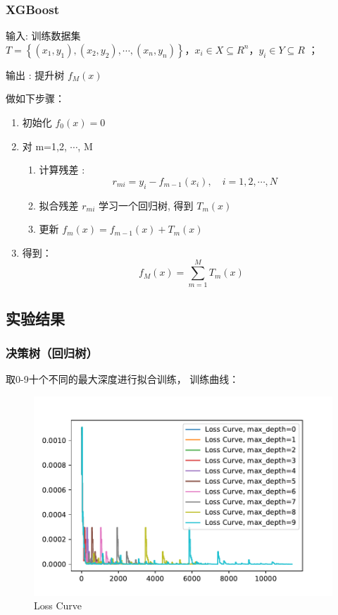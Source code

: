 \documentclass[UTF8,a4paper,AutoFakeBold,AutoFakeSlant]{article}
\begin{document}
\subsubsection{XGBoost}
输入: 训练数据集  $T=\left\{\left(x_{1}, y_{1}\right),\left(x_{2}, y_{2}\right), \cdots,\left(x_{n}, y_{n}\right)\right\} ， x_{i} \in X \subseteq R^{n} ， y_{i} \in Y \subseteq R$  ；

输出 : 提升树  $f_{M}(x)$

做如下步骤：
\begin{enumerate}
  \item 初始化  $f_{0}(x)=0 $
  \item 对  m=1,2, $\cdots$, M 
  \begin{enumerate}
    \item 计算残差 : $$ r_{m i}=y_{i}-f_{m-1}\left(x_{i}\right), \quad i=1,2, \cdots, N \quad $$
    \item 拟合残差 $ r_{m i}$  学习一个回归树, 得到  $T_{m}(x)$
    \item 更新  $f_{m}(x)=f_{m-1}(x)+T_{m}(x) $
  \end{enumerate}
  \item 得到：$$ f_{M}(x)=\sum_{m=1}^{M} T_{m}(x) $$
\end{enumerate}

\subsection{实验结果}

\subsubsection{决策树（回归树）}
取0-9十个不同的最大深度进行拟合训练，
训练曲线：
\begin{figure}[H]
  \centering
  \includegraphics[scale=0.675]{loss.pdf}
  \caption{Loss Curve}
  \label{f1}
\end{figure}
\end{document}
